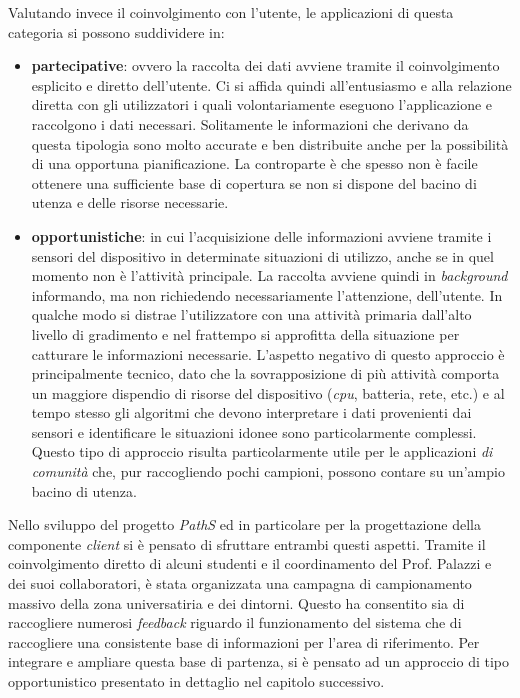 Valutando invece il coinvolgimento con l'utente, le applicazioni di questa categoria si possono suddividere in:
\begin{itemize}
  \item \textbf{partecipative}: ovvero la raccolta dei dati avviene tramite il coinvolgimento esplicito e diretto dell'utente. Ci si affida quindi all'entusiasmo e alla relazione diretta con gli utilizzatori i quali volontariamente eseguono l'applicazione e raccolgono i dati necessari. Solitamente le informazioni che derivano da questa tipologia sono molto accurate e ben distribuite anche per la possibilità di una opportuna pianificazione. La controparte è che spesso non è facile ottenere una sufficiente base di copertura se non si dispone del bacino di utenza e delle risorse necessarie. 
  \item \textbf{opportunistiche}: in cui l'acquisizione delle informazioni avviene tramite i sensori del dispositivo in determinate situazioni di utilizzo, anche se in quel momento non è l'attività principale. La raccolta avviene quindi in \emph{background} informando, ma non richiedendo necessariamente l'attenzione, dell'utente. In qualche modo si distrae l'utilizzatore con una attività primaria dall'alto livello di gradimento e nel frattempo si approfitta della situazione per catturare le informazioni necessarie. L'aspetto negativo di questo approccio è principalmente tecnico, dato che la sovrapposizione di più attività comporta un maggiore dispendio di risorse del dispositivo (\emph{cpu}, batteria, rete, etc.) e al tempo stesso gli algoritmi che devono interpretare i dati provenienti dai sensori e identificare le situazioni idonee sono particolarmente complessi. Questo tipo di approccio risulta particolarmente utile per le applicazioni \emph{di comunità} che, pur raccogliendo pochi campioni, possono contare su un'ampio bacino di utenza.
\end{itemize}
Nello sviluppo del progetto \emph{PathS} ed in particolare per la progettazione della componente \emph{client} si è pensato di sfruttare entrambi questi aspetti. Tramite il coinvolgimento diretto di alcuni studenti e il coordinamento del Prof. Palazzi e dei suoi collaboratori, è stata organizzata una campagna di campionamento massivo della zona universatiria e dei dintorni. Questo ha consentito sia di raccogliere numerosi \emph{feedback} riguardo il funzionamento del sistema che di raccogliere una consistente base di informazioni per l'area di riferimento. Per integrare e ampliare questa base di partenza, si è pensato ad un approccio di tipo opportunistico presentato in dettaglio nel capitolo successivo.

